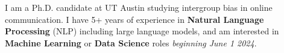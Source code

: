I am a Ph.D. candidate at UT Austin studying intergroup bias in online communication. I have 5+ years of experience in \textbf{Natural Language Processing} (NLP) including large language models, and am interested in  \textbf{Machine Learning} or \textbf{Data Science} roles \emph{beginning June 1 2024}.

